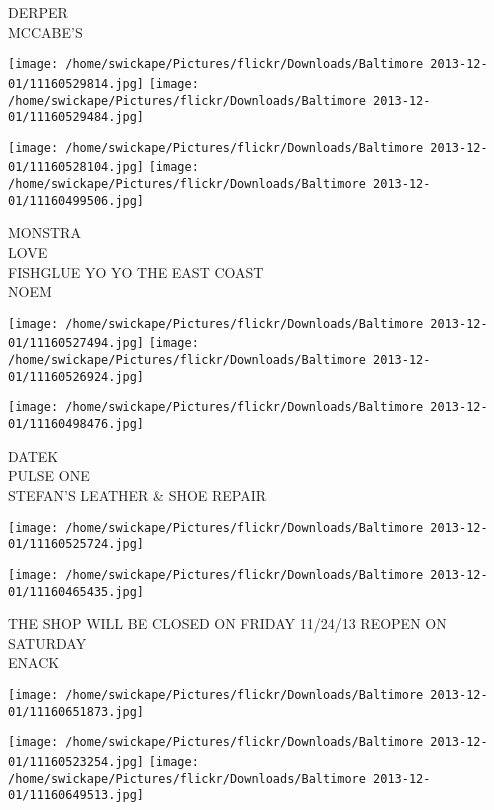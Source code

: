 \documentclass[10pt,letterpaper]{article}
\begin{document}
DERPER\\
MCCABE'S\\
\pagebreak

\texttt{[image: /home/swickape/Pictures/flickr/Downloads/Baltimore 2013-12-01/11160529814.jpg]}
\texttt{[image: /home/swickape/Pictures/flickr/Downloads/Baltimore 2013-12-01/11160529484.jpg]}

\texttt{[image: /home/swickape/Pictures/flickr/Downloads/Baltimore 2013-12-01/11160528104.jpg]}
\texttt{[image: /home/swickape/Pictures/flickr/Downloads/Baltimore 2013-12-01/11160499506.jpg]}

MONSTRA\\
LOVE\\
FISHGLUE YO YO THE EAST COAST\\
NOEM\\
\pagebreak

\texttt{[image: /home/swickape/Pictures/flickr/Downloads/Baltimore 2013-12-01/11160527494.jpg]}
\texttt{[image: /home/swickape/Pictures/flickr/Downloads/Baltimore 2013-12-01/11160526924.jpg]}

\vspace{0.25in}
\texttt{[image: /home/swickape/Pictures/flickr/Downloads/Baltimore 2013-12-01/11160498476.jpg]}

DATEK\\
PULSE ONE\\
STEFAN'S LEATHER \& SHOE REPAIR\\
\pagebreak

\texttt{[image: /home/swickape/Pictures/flickr/Downloads/Baltimore 2013-12-01/11160525724.jpg]}

\vspace{0.25in}
\texttt{[image: /home/swickape/Pictures/flickr/Downloads/Baltimore 2013-12-01/11160465435.jpg]}

THE SHOP WILL BE CLOSED ON FRIDAY 11/24/13 REOPEN ON SATURDAY\\
ENACK\\
\pagebreak

\texttt{[image: /home/swickape/Pictures/flickr/Downloads/Baltimore 2013-12-01/11160651873.jpg]}

\vspace{0.25in}
\texttt{[image: /home/swickape/Pictures/flickr/Downloads/Baltimore 2013-12-01/11160523254.jpg]}
\texttt{[image: /home/swickape/Pictures/flickr/Downloads/Baltimore 2013-12-01/11160649513.jpg]}
\end{document}
